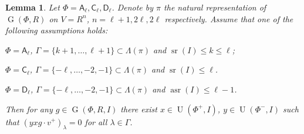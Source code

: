 \documentclass[oneside, 12pt]{amsart}
\theoremstyle{plain}
\numberwithin{equation}{section}
\newtheorem{lemma}{Lemma}
\numberwithin{lemma}{section}
\theoremstyle{definition}
\theoremstyle{remark}
\DeclareMathOperator{\G}{G}
\DeclareMathOperator{\U}{U}
\DeclareMathOperator{\sr}{sr}
\DeclareMathOperator{\asr}{asr}
\newcommand{\rA}{\mathsf{A}}
\newcommand{\rC}{\mathsf{C}}
\newcommand{\rD}{\mathsf{D}}
\begin{document}
\begin{lemma} \label{lemma:uraction} 
Let $\Phi=\rA_\ell, \rC_\ell, \rD_\ell$. Denote by $\pi$ the natural representation of $\G(\Phi, R)$ on $V=R^n$, $n=\ell+1, 2\ell, 2\ell$ respectively.
Assume that one of the following assumptions holds:
\begin{lemlist}
 \item \label{item:uractionA} $\Phi=\rA_\ell$, $\Gamma=\{ k+1, \ldots, \ell+1\} \subset \Lambda(\pi)$ and $\sr(I)\leq k\leq \ell$;
 \item \label{item:uractionC} $\Phi=\rC_\ell$, $\Gamma=\{-\ell,\ldots, -2, -1\} \subset \Lambda(\pi)$ and $\sr(I)\leq \ell$. 
 \item \label{item:uractionD} $\Phi=\rD_\ell$, $\Gamma=\{-\ell,\ldots, -2, -1\} \subset \Lambda(\pi)$ and $\asr(I)\leq \ell-1$. 
\end{lemlist}
Then for any $g\in \G(\Phi, R, I)$ there exist $x\in \U(\Phi^+, I)$, $y\in \U(\Phi^-, I)$ such that $(yxg \cdot v^+)_\lambda = 0$ for all $\lambda\in \Gamma$.
\end{lemma}
\end{document}
